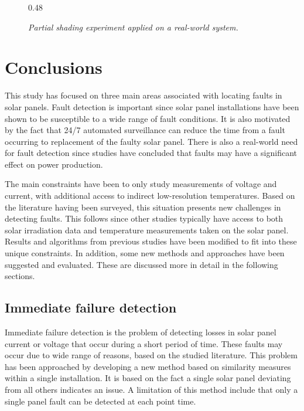 \begin{figure}[here]
\centering
{}
{0.48}
~
\caption[Partial shading experiment]{\emph{Partial shading experiment applied on a real-world system.}}
\end{figure}

\chapter{Conclusions}
This study has focused on three main areas associated with locating faults in solar panels.
Fault detection is important since solar panel installations have been shown to be susceptible to a wide range of fault conditions.
It is also motivated by the fact that 24/7 automated surveillance can reduce the time from a fault occurring to replacement of the faulty solar panel.
There is also a real-world need for fault detection since studies have concluded that faults may have a significant effect on power production.

The main constraints have been to only study measurements of voltage and current, with additional access to indirect low-resolution temperatures.
Based on the literature having been surveyed, this situation presents new challenges in detecting faults.
This follows since other studies typically have access to both solar irradiation data and temperature measurements taken on the solar panel.
Results and algorithms from previous studies have been modified to fit into these unique constraints.
In addition, some new methods and approaches have been suggested and evaluated.
These are discussed more in detail in the following sections.

\section{Immediate failure detection}
Immediate failure detection is the problem of detecting losses in solar panel current or voltage that occur during a short period of time.
These faults may occur due to wide range of reasons, based on the studied literature.
This problem has been approached by developing a new method based on similarity measures within a single installation.
It is based on the fact a single solar panel deviating from all others indicates an issue.
A limitation of this method include that only a single panel fault can be detected at each point time.


